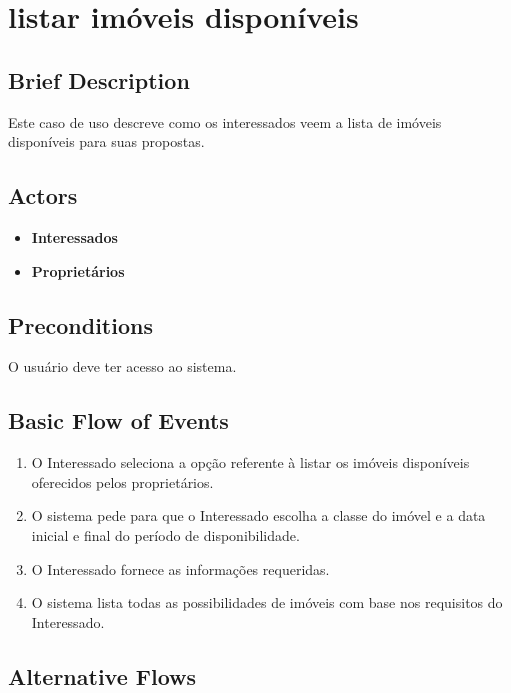 \section{ listar imóveis disponíveis}

\subsection*{Brief Description}

Este caso de uso descreve como os interessados veem a lista de imóveis disponíveis para suas
propostas.

\subsection*{Actors}

\begin{itemize}
    \item \textbf{Interessados}
    \item \textbf{Proprietários}
\end{itemize}

\subsection*{Preconditions}
 
O usuário deve ter acesso ao sistema.

\subsection*{Basic Flow of Events}

\begin{enumerate}
    \item O Interessado seleciona a opção referente à listar os imóveis disponíveis oferecidos pelos
    proprietários.
    \item O sistema pede para que o Interessado escolha a classe do imóvel e a data inicial e final do
    período de disponibilidade.
    \item O Interessado fornece as informações requeridas.
    \item  O sistema lista todas as possibilidades de imóveis com base nos requisitos do Interessado.
\end{enumerate}

\subsection*{Alternative Flows}

